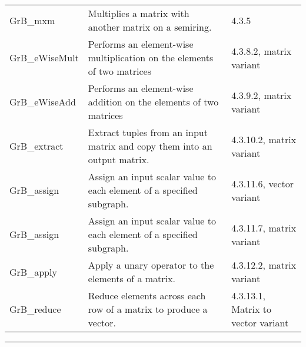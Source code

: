 \begin{table*}[h]
\begin{center}
\begin{tabular}{lll}
	{\sf GrB\_mxm}              & Multiplies a matrix with another matrix on a semiring.                                       &  4.3.5 \\
	{\sf GrB\_eWiseMult}        & Performs an element-wise multiplication on the elements of two matrices        &  4.3.8.2, matrix variant  \\
	{\sf GrB\_eWiseAdd}         & Performs an element-wise addition on the elements of two matrices                &  4.3.9.2, matrix variant \\
	{\sf GrB\_extract}          & Extract tuples from an input matrix and copy them into an output matrix.          & 4.3.10.2, matrix variant \\
	{\sf GrB\_assign}           & Assign an input scalar value to each element of a specified subgraph.               & 4.3.11.6, vector variant \\
	{\sf GrB\_assign}           & Assign an input scalar value to each element of a specified subgraph.              &  4.3.11.7, matrix variant \\
	{\sf GrB\_apply}            & Apply a unary operator to the elements of a matrix.                                            & 4.3.12.2, matrix variant \\
	{\sf GrB\_reduce}           & Reduce elements across each row of a matrix to produce a vector.                  & 4.3.13.1, Matrix to vector variant \\
\end{tabular}
\end{center}
\hrule
\end{table*}
